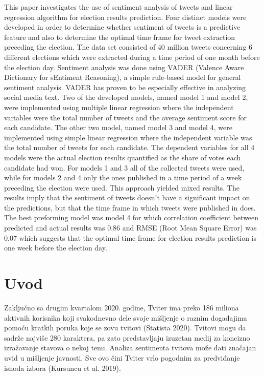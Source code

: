 \begin{AbstractEng}
This paper investigates the use of sentiment analysis of tweets and linear regression algorithm for election results prediction. Four distinct models were developed in order to determine whether sentiment of tweets is a predictive feature and also to determine the optimal time frame for tweet extraction preceding the election. The data set consisted of 40 million tweets concerning 6 different elections which were extracted during a time period of one month before the election day. Sentiment analysis was done using VADER (Valence Aware Dictionary for sEntiment Reasoning), a simple rule-based model for general sentiment analysis. VADER has proven to be especially effective in analyzing social media text. Two of the developed models, named model 1 and model 2, were implemented using multiple linear regression where the independent variables were the total number of tweets and the average sentiment score for each candidate. The other two model, named model 3 and model 4, were implemented using simple linear regression where the independent variable was the total number of tweets for each candidate. The dependent variables for all 4 models were the actual election results quantified as the share of votes each candidate had won. For models 1 and 3 all of the collected tweets were used, while for models 2 and 4 only the ones published in a time period of a week preceding the election were used. This approach yielded mixed results. The results imply that the sentiment of tweets doesn’t have a significant impact on the predictions, but that the time frame in which tweets were published in does. The best preforming model was model 4 for which correlation coefficient between predicted and actual results was 0.86 and RMSE (Root Mean Square Error) was 0.07 which suggests that the optimal time frame for election results prediction is one week before the election day.
\end{AbstractEng}

\StartDoublePaper
\label{rac.petra}

\section{Uvod}

Zaključno sa drugim kvartalom 2020. godine, Tviter ima preko 186 miliona aktivnih korisnika koji svakodnevno dele svoje mišljenje o raznim događajima pomoću kratkih poruka koje se zovu tvitovi (Statista 2020). Tvitovi mogu da sadrže najviše 280 karaktera, pa zato predstavljaju izuzetan medij za koncizno izražavanje stavova o nekoj temi. Analiza sentimenta tvitova može dati značajan uvid u mišljenje javnosti. Sve ovo čini Tviter vrlo pogodnim za predviđanje ishoda izbora (Kursuncu et al. 2019). 

